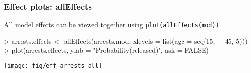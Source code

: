 %

\begin{frame}[fragile]
	\frametitle{Effect plots: allEffects}
  All model effects can be viewed together using \texttt{plot(allEffects(mod))}

\begin{Schunk}
\begin{Sinput}
> arrests.effects <- allEffects(arrests.mod, xlevels = list(age = seq(15, 
+     45, 5)))
> plot(arrests.effects, ylab = "Probability(released)", ask = FALSE)
\end{Sinput}
\end{Schunk}
\texttt{[image: fig/eff-arrests-all]}
\end{frame}

%
	
